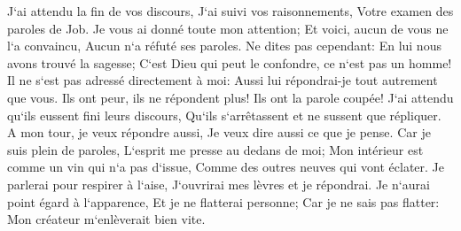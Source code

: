 \verse J`ai attendu la fin de vos discours, J`ai suivi vos raisonnements, Votre examen des paroles de Job. 
\verse Je vous ai donné toute mon attention; Et voici, aucun de vous ne l`a convaincu, Aucun n`a réfuté ses paroles. 
\verse Ne dites pas cependant: En lui nous avons trouvé la sagesse; C`est Dieu qui peut le confondre, ce n`est pas un homme! 
\verse Il ne s`est pas adressé directement à moi: Aussi lui répondrai-je tout autrement que vous. 
\verse Ils ont peur, ils ne répondent plus! Ils ont la parole coupée! 
\verse J`ai attendu qu`ils eussent fini leurs discours, Qu`ils s`arrêtassent et ne sussent que répliquer. 
\verse A mon tour, je veux répondre aussi, Je veux dire aussi ce que je pense. 
\verse Car je suis plein de paroles, L`esprit me presse au dedans de moi; 
\verse Mon intérieur est comme un vin qui n`a pas d`issue, Comme des outres neuves qui vont éclater. 
\verse Je parlerai pour respirer à l`aise, J`ouvrirai mes lèvres et je répondrai. 
\verse Je n`aurai point égard à l`apparence, Et je ne flatterai personne; 
\verse Car je ne sais pas flatter: Mon créateur m`enlèverait bien vite. 

